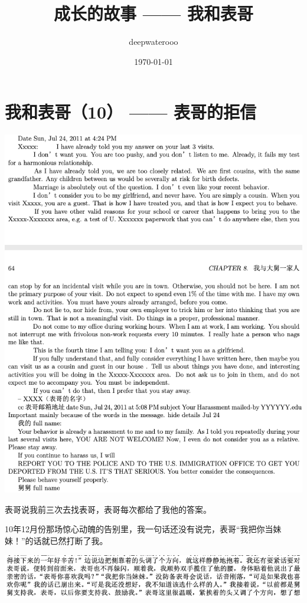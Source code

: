 \documentclass[9pt, b5paper]{article}
\author{deepwaterooo}
\date{\today}
\title{成长的故事 —— 我和表哥}
\begin{document}
\maketitle
\tableofcontents


\section{我和表哥（10） —— 表哥的拒信}
\label{sec:orgebf613e}

\begin{center}
\includegraphics[width=.9\linewidth]{./pic/p1p64.png}
\end{center}

表哥说我前三次去找表哥，表哥每次都给了我他的答案。

10年12月份那场惊心动魄的告别里，我一句话还没有说完，表哥“我把你当妹妹！”的话就已然打断了我。

\begin{center}
\includegraphics[width=.9\linewidth]{./pic/p1p43.png}
\end{center}
\end{document}
